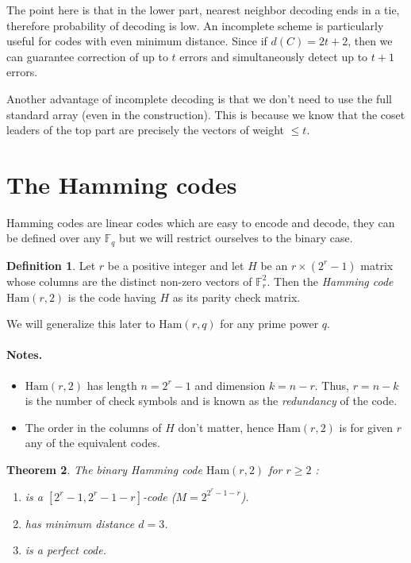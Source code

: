 \documentclass[11pt,a4paper]{article}
\theoremstyle{definition}
\newtheorem{definition}{Definition}[section]
\theoremstyle{plain}
\newtheorem{theorem}[definition]{Theorem}
\theoremstyle{remark}
\begin{document}
The point here is that in the lower part, nearest neighbor decoding ends in a tie, therefore probability of decoding is low. 
An incomplete scheme is particularly useful for codes with even minimum distance. Since if $d(C) = 2t + 2$, then we can guarantee correction of up to $t$ errors
and simultaneously detect up to $t + 1$ errors.

Another advantage of incomplete decoding is that we don't need to use the full standard array (even in the construction). This 
is because we know that the coset leaders of the top part are precisely the vectors of weight $\leq t$.

\section{The Hamming codes} 

Hamming codes are linear codes which are easy to encode and decode, they can be defined over any $\mathbb{F}_q$ but we will restrict ourselves 
to the binary case. 

\begin{definition}
    Let $r$ be a positive integer and let $H$ be an $r \times (2^r - 1)$ matrix whose columns are the distinct non-zero vectors of 
    $\mathbb{F}_r^2$. Then the \emph{Hamming code} $\text{Ham}(r,2)$ is the code having $H$ as its parity check matrix.

    We will generalize this later to $\text{Ham}(r, q)$ for any prime power $q$.
\end{definition}

\paragraph{Notes.} 
\begin{itemize}
    \item $\text{Ham}(r,2)$ has length $n = 2^r - 1$ and dimension $k = n - r$. 
    Thus, $r = n - k$ is the number of check symbols and is known as the \emph{redundancy} of the code. 
    \item The order in the columns of $H$ don't matter, hence $\text{Ham}(r, 2)$ is for given $r$ any of the equivalent codes. 
\end{itemize}

\begin{theorem}\label{thm:hamming-code-properties}
    The binary Hamming code $\text{Ham}(r,2)$ for $r \geq 2$ : 
    \begin{enumerate}[label = (\roman*)]
        \item is a $[2^r - 1, 2^r - 1 - r]$-code ($M = 2^{2^r - 1 - r}$).
        \item has minimum distance $d = 3$. 
        \item is  a perfect code. 
    \end{enumerate}    
\end{theorem}
\end{document}
